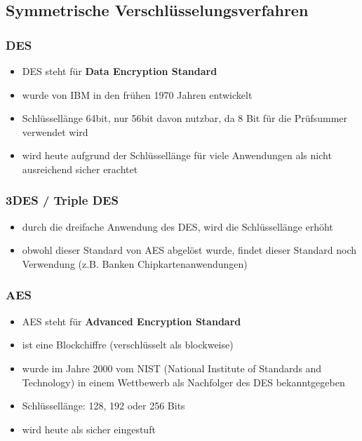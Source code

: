 \subsection{Symmetrische Verschlüsselungsverfahren}

\subsubsection{DES}

\begin{itemize}
\item DES steht für \textbf{Data Encryption Standard}
\item wurde von IBM in den frühen 1970 Jahren entwickelt
\item Schlüssellänge 64bit, nur 56bit davon nutzbar, da 8 Bit für die Prüfsummer verwendet wird
\item wird heute aufgrund der Schlüssellänge für viele Anwendungen als nicht ausreichend sicher erachtet
\end{itemize}

\subsubsection{3DES / Triple DES}

\begin{itemize}
\item durch die dreifache Anwendung des DES, wird die Schlüssellänge erhöht
\item obwohl dieser Standard von AES abgelöst wurde, findet dieser Standard noch Verwendung (z.B. Banken Chipkartenanwendungen)
\end{itemize}

\subsubsection{AES}

\begin{itemize}
\item AES steht für \textbf{Advanced Encryption Standard}
\item ist eine Blockchiffre (verschlüsselt als blockweise)
\item wurde im Jahre 2000 vom NIST (National Institute of Standards and Technology) in einem Wettbewerb als Nachfolger des DES bekanntgegeben
\item Schlüssellänge: 128, 192 oder 256 Bits
\item wird heute als sicher eingestuft
\end{itemize}

